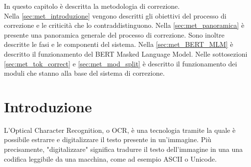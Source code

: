 In questo capitolo è descritta la metodologia di correzione.\\
Nella \autoref{sec:met_introduzione} vengono descritti gli obiettivi del processo di correzione e le criticità che lo contraddistinguono.
Nella \autoref{sec:met_panoramica} è presente una panoramica generale del processo di correzione. Sono inoltre descritte le fasi e le componenti del sistema. Nella \autoref{sec:met_BERT_MLM} è descritto il funzionamento del BERT Masked Language Model. Nelle sottosezioni \ref{sec:met_tok_correct} e \ref{sec:met_mod_split} è descritto il funzionamento dei moduli che stanno alla base del sistema di correzione.


\section{Introduzione}
\label{sec:met_introduzione}
L'Optical Character Recognition, o OCR, è una tecnologia tramite la quale è possibile estrarre e digitalizzare il testo presente in un'immagine. Più precisamente, "digitalizzare" significa tradurre il testo dell'immagine in una una codifica leggibile da una macchina, come ad esempio ASCII o Unicode.


